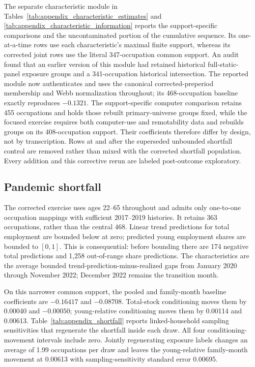 The separate characteristic module in Tables~\ref{tab:appendix_characteristic_estimates} and \ref{tab:appendix_characteristic_information} reports the support-specific comparisons and the uncontaminated portion of the cumulative sequence.  Its one-at-a-time rows use each characteristic's maximal finite support, whereas its corrected joint rows use the literal 347-occupation common support.  An audit found that an earlier version of this module had retained historical full-static-panel exposure groups and a 341-occupation historical intersection.  The reported module now authenticates and uses the canonical corrected-preperiod membership and Webb normalization throughout; its 468-occupation baseline exactly reproduces $-0.1321$.  The support-specific computer comparison retains 455 occupations and holds those rebuilt primary-universe groups fixed, while the focused exercise requires both computer-use and remotability data and rebuilds groups on its 408-occupation support.  Their coefficients therefore differ by design, not by transcription.  Rows at and after the superseded unbounded shortfall control are removed rather than mixed with the corrected shortfall population.  Every addition and this corrective rerun are labeled post-outcome exploratory.





\subsection{Pandemic shortfall}

The corrected exercise uses ages 22--65 throughout and admits only one-to-one occupation mappings with sufficient 2017--2019 histories.  It retains 363 occupations, rather than the central 468.  Linear trend predictions for total employment are bounded below at zero; predicted young employment shares are bounded to $[0,1]$.  This is consequential: before bounding there are 174 negative total predictions and 1,258 out-of-range share predictions.  The characteristics are the average bounded trend-prediction-minus-realized gaps from January 2020 through November 2022; December 2022 remains the transition month.

On this narrower common support, the pooled and family-month baseline coefficients are $-0.16417$ and $-0.08708$.  Total-stock conditioning moves them by 0.00040 and $-0.00050$; young-relative conditioning moves them by 0.00114 and 0.00613.  Table~\ref{tab:appendix_shortfall} reports linked-household sampling sensitivities that regenerate the shortfall inside each draw.  All four conditioning-movement intervals include zero.  Jointly regenerating exposure labels changes an average of 1.99 occupations per draw and leaves the young-relative family-month movement at 0.00613 with sampling-sensitivity standard error 0.00695.

